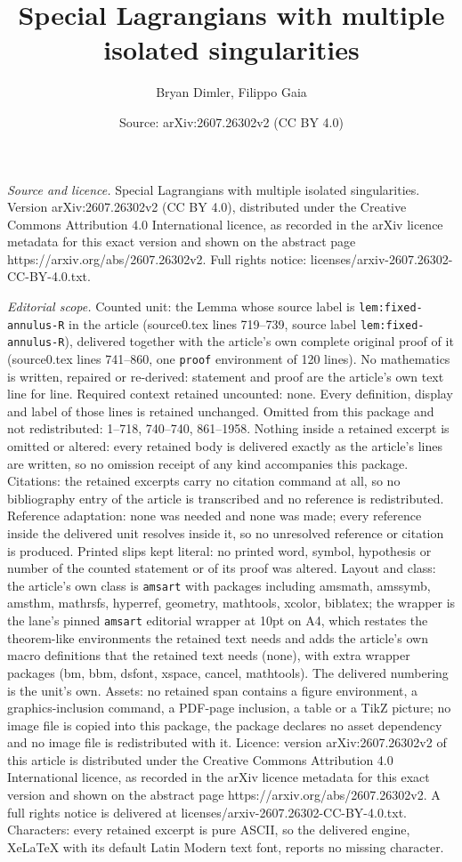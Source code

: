 \documentclass[10pt,a4paper]{amsart}
\title[Special Lagrangians with multiple isolated singularities]{Special Lagrangians with multiple isolated singularities}
\author{Bryan Dimler, Filippo Gaia}
\date{Source: arXiv:2607.26302v2 (CC BY 4.0)}
\begin{document}
\maketitle

\noindent\emph{Source and licence.} Special Lagrangians with multiple isolated singularities. Version arXiv:2607.26302v2 (CC BY 4.0), distributed under the Creative Commons Attribution 4.0 International licence, as recorded in the arXiv licence metadata for this exact version and shown on the abstract page https://arxiv.org/abs/2607.26302v2. Full rights notice: licenses/arxiv-2607.26302-CC-BY-4.0.txt.\par\smallskip

\noindent\textit{Editorial scope.} Counted unit: the Lemma whose source label is \texttt{lem:fixed-annulus-R} in the article (source0.tex lines 719--739, source label \texttt{lem:fixed-annulus-R}), delivered together with the article's own complete original proof of it (source0.tex lines 741--860, one \texttt{proof} environment of 120 lines). No mathematics is written, repaired or re-derived: statement and proof are the article's own text line for line. Required context retained uncounted: none. Every definition, display and label of those lines is retained unchanged. Omitted from this package and not redistributed: 1--718, 740--740, 861--1958. Nothing inside a retained excerpt is omitted or altered: every retained body is delivered exactly as the article's lines are written, so no omission receipt of any kind accompanies this package. Citations: the retained excerpts carry no citation command at all, so no bibliography entry of the article is transcribed and no reference is redistributed. Reference adaptation: none was needed and none was made; every reference inside the delivered unit resolves inside it, so no unresolved reference or citation is produced. Printed slips kept literal: no printed word, symbol, hypothesis or number of the counted statement or of its proof was altered. Layout and class: the article's own class is \texttt{amsart} with packages including amsmath, amssymb, amsthm, mathrsfs, hyperref, geometry, mathtools, xcolor, biblatex; the wrapper is the lane's pinned \texttt{amsart} editorial wrapper at 10pt on A4, which restates the theorem-like environments the retained text needs and adds the article's own macro definitions that the retained text needs (none), with extra wrapper packages (bm, bbm, dsfont, xspace, cancel, mathtools). The delivered numbering is the unit's own. Assets: no retained span contains a figure environment, a graphics-inclusion command, a PDF-page inclusion, a table or a TikZ picture; no image file is copied into this package, the package declares no asset dependency and no image file is redistributed with it. Licence: version arXiv:2607.26302v2 of this article is distributed under the Creative Commons Attribution 4.0 International licence, as recorded in the arXiv licence metadata for this exact version and shown on the abstract page https://arxiv.org/abs/2607.26302v2. A full rights notice is delivered at licenses/arxiv-2607.26302-CC-BY-4.0.txt. Characters: every retained excerpt is pure ASCII, so the delivered engine, XeLaTeX with its default Latin Modern text font, reports no missing character.
\end{document}
